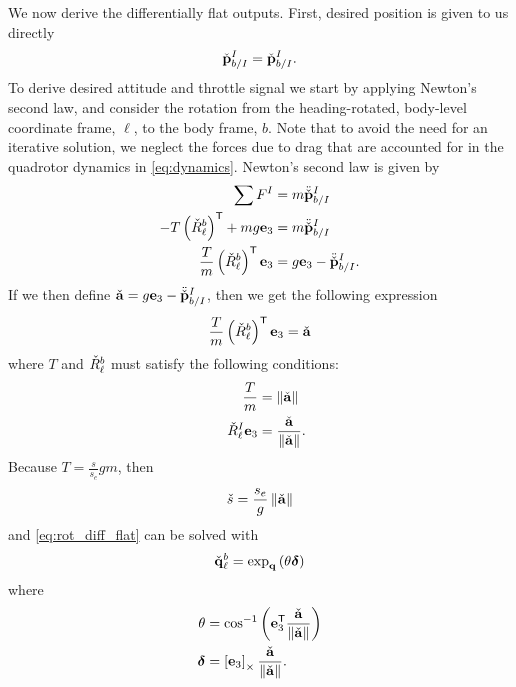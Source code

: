 We now derive the differentially
flat outputs.  First, desired position is given to us directly
\begin{equation}
	\check{\boldsymbol{\mathrm{p}}}_{b/I}^I = \check{\boldsymbol{\mathrm{p}}}_{b/I}^I. 
\end{equation}
To derive desired attitude and throttle signal we start 
by applying Newton's second law, and consider the rotation from the heading-rotated, body-level
coordinate frame, $\ell$, to
the body frame, $b$. Note that to avoid the need for an iterative solution, we neglect the forces due to drag
that are accounted for in the quadrotor dynamics in \eqref{eq:dynamics}.
Newton's second law is given by
\begin{align}
	\sum F^I &= m\ddot{\check{\boldsymbol{\mathrm{p}}}}_{b/I}^I\\
    -T \left(\check{R}_\ell^b\right)^{\mathsf{T}} + mg\boldsymbol{\mathrm{e}}_3 &= m\ddot{\check{\boldsymbol{\mathrm{p}}}}_{b/I}^I\\
    \frac{T}{m}\left(\check{R}_\ell^b\right)^{\mathsf{T}}\boldsymbol{\mathrm{e}}_3 &= g\boldsymbol{\mathrm{e}}_3 -
    \ddot{\check{\boldsymbol{\mathrm{p}}}}_{b/I}^I.
\end{align}
If we then define $\check{\boldsymbol{\mathrm{a}}} = g\boldsymbol{\mathrm{e}}_3 - \ddot{\check{\boldsymbol{\mathrm{p}}}}_{b/I}^I$,
then we get the following expression
\begin{equation}
	\frac{T}{m}\left(\check{R}_\ell^b\right)^{\mathsf{T}}\boldsymbol{\mathrm{e}}_3 = \check{\boldsymbol{\mathrm{a}}}
\end{equation}
where $T$ and $\check{R}_\ell^b$ must satisfy the following conditions:
\begin{align}
	\frac{T}{m} &= \left\Vert \check{\boldsymbol{\mathrm{a}}}\right\Vert \\
	\quad \check{R}_\ell^I\boldsymbol{\mathrm{e}}_3 &= \frac{\check{\boldsymbol{\mathrm{a}}}}{\left\Vert \check{\boldsymbol{\mathrm{a}}}\right\Vert}. \label{eq:rot_diff_flat}
\end{align}
Because $T=\tfrac{s}{s_e}gm$, then
\begin{equation}
	\check{s} = \frac{s_e}{g}\left\Vert \check{\boldsymbol{\mathrm{a}}}\right\Vert
\end{equation}
and \eqref{eq:rot_diff_flat} can be solved with
\begin{equation}
  \check{\boldsymbol{\mathrm{q}}}_\ell^b = \exp_{\boldsymbol{\mathrm{q}}} \left( \theta \boldsymbol{\mathrm{\delta}} \right)
\end{equation}
where
\begin{align}
  \theta &= \mathrm{cos}^{-1}\left(\boldsymbol{\mathrm{e}}_3^{\mathsf{T}}\frac{\check{\boldsymbol{\mathrm{a}}}}{\left\Vert \check{\boldsymbol{\mathrm{a}}}\right\Vert}\right) \\
	\boldsymbol{\mathrm{\delta}} &= \left[ \boldsymbol{\mathrm{e}}_3 \right]_{\times}\frac{\check{\boldsymbol{\mathrm{a}}}}{\left\Vert \check{\boldsymbol{\mathrm{a}}}\right\Vert}.
\end{align}
